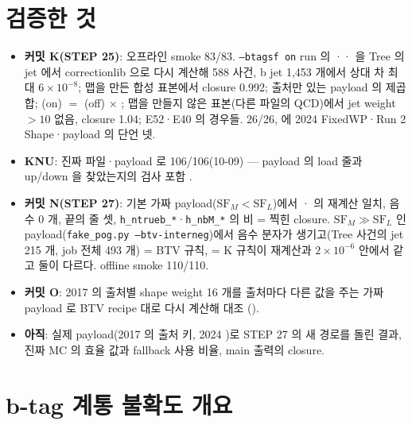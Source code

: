\section{검증한 것}\label{sec:btag-validation}

\begin{itemize}
\item \textbf{커밋 K(STEP 25)}: 오프라인 smoke 83/83. \texttt{--btagsf on} run 의 ·· 을 Tree 의 jet 에서
  correctionlib 으로 다시 계산해 588 사건, b jet 1,453 개에서 상대 차 최대 $6\times10^{-8}$; 맵을 만든 합성 표본에서 closure 0.992; 출처만 있는 payload 의
  제곱합; (on) $=$ (off) $\times$ ; 맵을 만들지 않은 표본(다른 파일의 QCD)에서 jet weight $>10$ 없음,
  closure 1.04; E52·E40 의 경우들\tagtest.  26/26,  에 2024
  FixedWP·Run 2 Shape·payload 의 단언 넷.
\item \textbf{KNU}: 진짜 파일·payload 로  106/106(10-09) --- payload 의 load 줄과 up/down 을 찾았는지의 검사 포함
  \tagtest.
\item \textbf{커밋 N(STEP 27)}: 기본 가짜 payload($\mathrm{SF}_M<\mathrm{SF}_L$)에서 · 의 재계산 일치, 음수 0 개, 끝의 줄 셋,
  \texttt{h\_ntrueb\_*}·\texttt{h\_nbM\_*} 의 비 = 찍힌 closure. $\mathrm{SF}_M\gg\mathrm{SF}_L$ 인 payload(\texttt{fake\_pog.py --btv-interneg})에서
  음수 분자가 생기고(Tree 사건의 jet 215 개, job 전체 493 개)  = BTV 규칙,  = K 규칙이 재계산과 $2\times10^{-6}$ 안에서
  같고 둘이 다르다. offline smoke 110/110\tagtest.
\item \textbf{커밋 O}: 2017 의 출처별 shape weight 16 개를 출처마다 다른 값을 주는 가짜 payload 로 BTV recipe 대로 다시 계산해 대조
  ()\tagtest.
\item \textbf{아직}: 실제 payload(2017  의 출처 키, 2024 )로 STEP 27 의 새 경로를 돌린 결과, 진짜 MC 의
  효율 값과 fallback 사용 비율, main 출력의 closure.
\end{itemize}

\section{b-tag 계통 불확도 개요}\label{sec:btag-syst}

